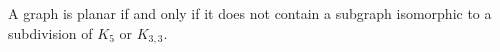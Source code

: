 

\setcounter{section}{3}
\setcounter{subsection}{3}
\setcounter{dfn}{10}

\begin{thm}[Kuratowski]
A graph is planar if and only if it does not contain a subgraph isomorphic to a subdivision of $K_5$ or $K_{3,3}$.
\end{thm}

